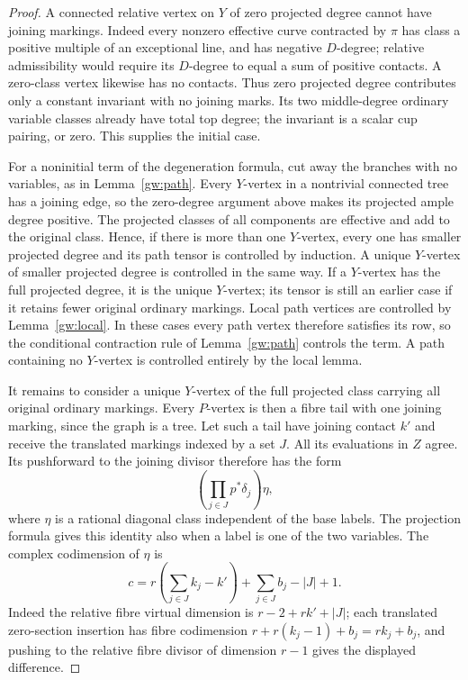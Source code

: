 \begin{proof}
A connected relative vertex on $Y$ of zero projected degree cannot have
joining markings.  Indeed every nonzero effective curve contracted by
$\pi$ has class a positive multiple of an exceptional line, and has negative
$D$-degree; relative admissibility would require its $D$-degree to equal a
sum of positive contacts.  A zero-class vertex likewise has no contacts.
Thus zero projected degree contributes only a constant invariant with no
joining marks.  Its two middle-degree ordinary variable classes already
have total top degree; the invariant is a scalar cup pairing, or zero.
This supplies the initial case.

For a noninitial term of the degeneration formula, cut away the branches
with no variables, as in Lemma~\ref{gw:path}.
Every $Y$-vertex in a nontrivial connected tree has a joining edge, so the
zero-degree argument above makes its projected ample degree positive.
The projected classes of all components are effective and add to the
original class.  Hence, if there is more than one $Y$-vertex, every one
has smaller projected degree and its path tensor is controlled by induction.
A unique $Y$-vertex of smaller projected degree is controlled in the same way.
If a $Y$-vertex has the full projected degree, it is the unique $Y$-vertex;
its tensor is still an earlier case if it retains fewer original ordinary
markings.  Local path vertices are controlled by Lemma~\ref{gw:local}.
In these cases every path vertex therefore satisfies its row, so the
conditional contraction rule of Lemma~\ref{gw:path} controls the term.
A path containing no $Y$-vertex is controlled entirely by the local lemma.

It remains to consider a unique $Y$-vertex of the full projected class
carrying all original ordinary markings.
Every $P$-vertex is then a fibre tail with one joining marking, since the
graph is a tree.  Let such a tail have joining contact $k'$ and receive the
translated markings indexed by a set $J$.  All its evaluations in $Z$
agree.  Its pushforward to the joining divisor therefore has the form
\[
 \left(\prod_{j\in J}p^*\delta_j\right)\eta,
\]
where $\eta$ is a rational diagonal class independent of the base labels.
The projection formula gives this identity also when a label is one of the
two variables.  The complex codimension of $\eta$ is
\begin{equation}\label{gw:tail-codim}
c=r\left(\sum_{j\in J}k_j-k'\right)
       +\sum_{j\in J}b_j-|J|+1.
\end{equation}
Indeed the relative fibre virtual dimension is
$r-2+rk'+|J|$; each translated zero-section insertion has fibre codimension
$r+r(k_j-1)+b_j=rk_j+b_j$, and pushing to the relative fibre divisor of
dimension $r-1$ gives the displayed difference.


\end{proof}
